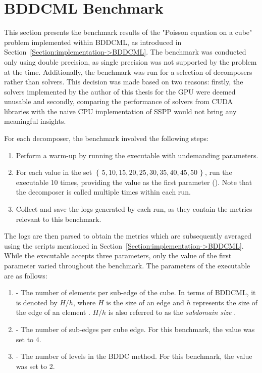 \section{BDDCML Benchmark}\label{Section:comparing-decomposers-and-solvers->bddcml-benchmark}
This section presents the benchmark results of the "Poisson equation on a cube" problem implemented within BDDCML, as introduced in Section~\ref{Section:implementation->BDDCML}. The benchmark was conducted only using double precision, as single precision was not supported by the problem at the time. Additionally, the benchmark was run for a selection of decomposers rather than solvers. This decision was made based on two reasons: firstly, the solvers implemented by the author of this thesis for the GPU were deemed unusable and secondly, comparing the performance of solvers from CUDA libraries with the naive CPU implementation of SSPP would not bring any meaningful insights.

For each decomposer, the benchmark involved the following steps:

\begin{enumerate}
	\itemsep=0em %
	\item Perform a warm-up by running the  executable with undemanding parameters.
	\item For each value in the set $\left\{\, 5, 10, 15, 20, 25, 30, 35, 40, 45, 50\,\right\}$, run the  executable 10 times, providing the value as the first parameter (). Note that the decomposer is called multiple times within each run.
	\item Collect and save the logs generated by each run, as they contain the metrics relevant to this benchmark.
\end{enumerate}

The logs are then parsed to obtain the metrics which are subsequently averaged using the scripts mentioned in Section~\ref{Section:implementation->BDDCML}. While the  executable accepts three parameters, only the value of the first parameter varied throughout the benchmark. The parameters of the executable are as follows:

\begin{enumerate}
	\itemsep=0em %
	\item {} - The number of elements per sub-edge of the cube. In terms of BDDCML, it is denoted by $H/h$, where $H$ is the size of an edge and $h$ represents the size of the edge of an element \cite{6ZBqOb318XgFqC5W}. $H/h$ is also referred to as the \textit{subdomain size} \cite{6ZBqOb318XgFqC5W}.
	\item {} - The number of sub-edges per cube edge. For this benchmark, the value was set to 4.
	\item {} - The number of levels in the BDDC method. For this benchmark, the value was set to 2.
\end{enumerate}

